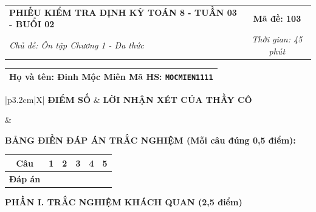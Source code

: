 \documentclass[12pt,a4paper]{article}
\begin{document}
\newpage


\noindent
\begin{tabularx}{\linewidth}{|X|c|}
\hline
\textbf{PHIẾU KIỂM TRA ĐỊNH KỲ TOÁN 8 - TUẦN 03 - BUỔI 02} & \textbf{Mã đề: 103} \\
\textit{Chủ đề: Ôn tập Chương 1 - Đa thức} & \textit{Thời gian: 45 phút} \\
\hline
\end{tabularx}

\vspace{1mm}

\noindent
\begin{tabularx}{\linewidth}{|X|}
\hline
\rule[-2mm]{0pt}{7.5mm}\textbf{Họ và tên:} \textbf{\large Đinh Mộc Miên} \hfill \textbf{Mã HS:} \texttt{MOCMIEN1111} \quad \\
\hline
\end{tabularx}

\vspace{1mm}

\noindent
\begin{tabularx}{\linewidth}{|p{3.2cm}|X|}
\hline
\centering\textbf{ĐIỂM SỐ} & \centering\textbf{LỜI NHẬN XÉT CỦA THẦY CÔ} \tabularnewline
\hline
\rule{0pt}{1.3cm} & \tabularnewline
\hline
\end{tabularx}

\vspace{1.2mm}

\noindent\textbf{BẢNG ĐIỀN ĐÁP ÁN TRẮC NGHIỆM (Mỗi câu đúng 0,5 điểm):}
\vspace{0.8mm}

\noindent
\renewcommand{\arraystretch}{1.35}
\begin{tabularx}{\linewidth}{|c|*{5}{>{\centering\arraybackslash}X|}}
\hline
\textbf{Câu} & \textbf{1} & \textbf{2} & \textbf{3} & \textbf{4} & \textbf{5} \\
\hline
\textbf{Đáp án} & & & & & \\
\hline
\end{tabularx}
\renewcommand{\arraystretch}{1.0}

\vspace{1.5mm}

\noindent\textbf{\large PHẦN I. TRẮC NGHIỆM KHÁCH QUAN (2,5 điểm)}
\vspace{1mm}
\end{document}
